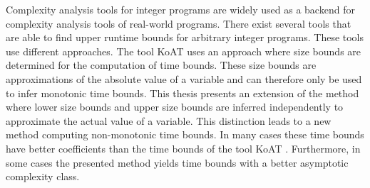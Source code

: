 Complexity analysis tools for integer programs are widely used as a backend for complexity analysis tools of real-world programs.
There exist several tools that are able to find upper runtime bounds for arbitrary integer programs.
These tools use different approaches.
The tool KoAT \cite{koat} uses an approach where size bounds are determined for the computation of time bounds.
These size bounds are approximations of the absolute value of a variable and can therefore only be used to infer monotonic time bounds.
This thesis presents an extension of the method where lower size bounds and upper size bounds are inferred independently to approximate the actual value of a variable.
This distinction leads to a new method computing non-monotonic time bounds.
In many cases these time bounds have better coefficients than the time bounds of the tool KoAT \cite{koat}.
Furthermore, in some cases the presented method yields time bounds with a better asymptotic complexity class. 

